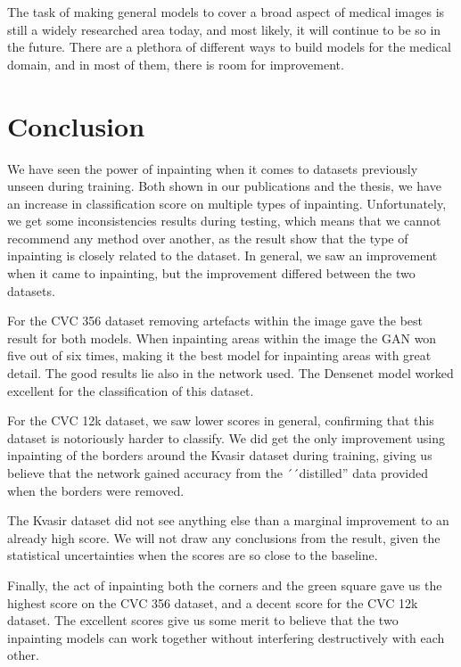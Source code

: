 The task of making general models to cover a broad aspect of medical images is still a widely researched area today, and most likely, it will continue to be so in the future. There are a  plethora of different ways to build models for the medical domain, and in most of them, there is room for improvement.

\section{Conclusion}
We have seen the power of inpainting when it comes to datasets previously unseen during training. Both shown in our publications and the thesis, we have an increase in classification score on multiple types of inpainting.
Unfortunately, we get some inconsistencies results during testing, which means that we cannot recommend any method over another, as the result show that the type of inpainting is closely related to the dataset.
In general, we saw an improvement when it came to inpainting, but the improvement differed between the two datasets. 

For the CVC 356 dataset removing artefacts within the image gave the best result for both models. When inpainting areas within the image the GAN won five out of six times, making it the best model for inpainting  areas with great detail. The good results lie also in the network used. The Densenet model worked excellent for the classification of this dataset.


For the CVC 12k dataset, we saw lower scores in general, confirming that this dataset is notoriously harder to classify. We did get the only improvement using inpainting of the borders around the Kvasir dataset during training, giving us believe that the network gained accuracy from the ´´distilled'' data provided when the borders were removed. 

The Kvasir dataset did not see anything else than a marginal improvement to an already high score. We will not draw any conclusions from the result, given the statistical uncertainties when the scores are so close to the baseline.


Finally, the act of inpainting both the corners and the green square gave us the highest score on the CVC 356 dataset, and a decent score for the CVC 12k dataset. The excellent scores give us some merit to believe that the two inpainting models can work together without interfering destructively with each other. 

\vspace{5px}

